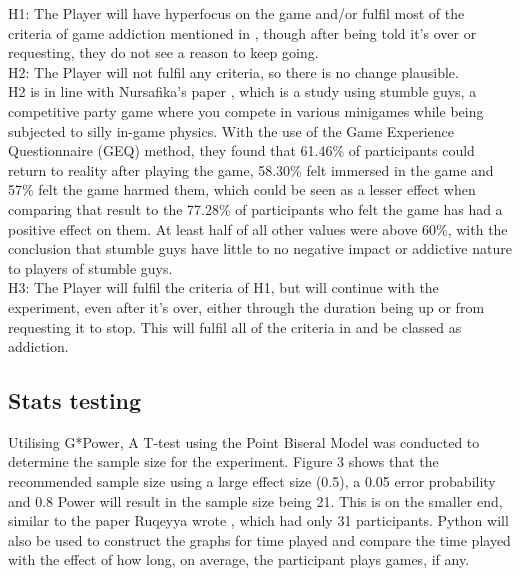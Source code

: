 \documentclass[conference]{IEEEtran}
\begin{document}
H1: The Player will have hyperfocus on the game and/or fulfil most of the criteria of game addiction mentioned in \cite{NHSHamp24}, though after being told it's over or requesting, they do not see a reason to keep going.\\

H2: The Player will not fulfil any criteria, so there is no change plausible.\\

H2 is in line with Nursafika's paper \cite{Nursafika2024}, which is a study using stumble guys, a competitive party game where you compete in various minigames while being subjected to silly in-game physics. With the use of the Game Experience Questionnaire (GEQ) method, they found that 61.46\% of participants could return to reality after playing the game, 58.30\% felt immersed in the game and 57\% felt the game harmed them, which could be seen as a lesser effect when comparing that result to the 77.28\% of participants who felt the game has had a positive effect on them. At least half of all other values were above 60\%,  with the conclusion that stumble guys have little to no negative impact or addictive nature to players of stumble guys.\\

H3: The Player will fulfil the criteria of H1, but will continue with the experiment, even after it's over, either through the duration being up or from requesting it to stop. This will fulfil all of the criteria in \cite{NHSHamp24} and be classed as addiction. \\

\subsection{Stats testing}
Utilising G*Power, A T-test using the Point Biseral Model was conducted to determine the sample size for the experiment. Figure 3 shows that the recommended sample size using a large effect size (0.5), a 0.05 error probability and 0.8 Power will result in the sample size being 21.  This is on the smaller end, similar to the paper Ruqeyya wrote \cite{Ruqeyya2022}, which had only 31 participants.  Python will also be used to construct the graphs for time played and compare the time played with the effect of how long, on average, the participant plays games, if any.\\
\end{document}
